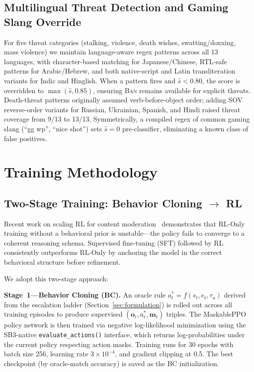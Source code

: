 \documentclass[journal]{IEEEtran}
\begin{document}
\subsection{Multilingual Threat Detection and Gaming Slang Override}

For five threat categories (stalking, violence, death wishes, swatting/doxxing, mass
violence) we maintain language-aware regex patterns across all 13 languages, with
character-based matching for Japanese/Chinese, RTL-safe patterns for Arabic/Hebrew, and
both native-script and Latin transliteration variants for Indic and Hinglish. When a
pattern fires and $\hat{s} < 0.80$, the score is overridden to $\max(\hat{s}, 0.85)$,
ensuring \textsc{Ban} remains available for explicit threats. Death-threat patterns
originally assumed verb-before-object order; adding SOV reverse-order variants for
Russian, Ukrainian, Spanish, and Hindi raised threat coverage from 9/13 to 13/13.
Symmetrically, a compiled regex of common gaming slang (``gg wp'', ``nice shot'') sets
$\hat{s} = 0$ pre-classifier, eliminating a known class of false positives.


\section{Training Methodology}
\label{sec:training}

\subsection{Two-Stage Training: Behavior Cloning $\to$ RL}

Recent work on scaling RL for content moderation~\cite{liu2025meta} demonstrates that
RL-Only training without a behavioral prior is unstable---the policy fails to converge
to a coherent reasoning schema. Supervised fine-tuning (SFT) followed by RL consistently
outperforms RL-Only by anchoring the model in the correct behavioral structure before
refinement.

We adopt this two-stage approach:

\textbf{Stage~1---Behavior Cloning (BC).} An oracle rule $a^*_t = f(s_t, e_t, \tau_u)$
derived from the escalation ladder (Section~\ref{sec:formulation}) is rolled out across
all training episodes to produce supervised $({\mathbf{o}_t, a^*_t, \mathbf{m}_t})$ triples.
The MaskablePPO policy network is then trained via negative log-likelihood minimization
using the SB3-native \texttt{evaluate\_actions()} interface, which returns log-probabilities
under the current policy respecting action masks. Training runs for 30 epochs with batch
size 256, learning rate $3 \times 10^{-4}$, and gradient clipping at 0.5. The best
checkpoint (by oracle-match accuracy) is saved as the BC initialization.
\end{document}
